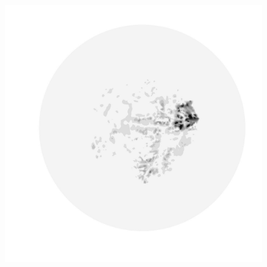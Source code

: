 \begin{figure}
\begin{minipage}[b]{0.30\linewidth}
  \end{minipage}
  \quad
  \begin{minipage}[b]{0.30\linewidth}
    \includegraphics[width=1.0\textwidth]{images/EISMINT_II/U/U_mag_500.jpg}
  \end{minipage}
  

\end{figure}
